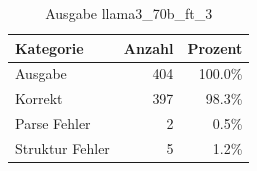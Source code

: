 
\begin{table}[!ht]
\centering
\begin{tabular}{lrr}
\toprule
\textbf{Kategorie} & \textbf{Anzahl} & \textbf{Prozent} \\
\midrule
Ausgabe & 404 & 100.0\% \\
Korrekt & 397 & 98.3\% \\
Parse Fehler & 2 & 0.5\% \\
Struktur Fehler & 5 & 1.2\% \\
\bottomrule
\end{tabular}
\caption{Ausgabe llama3_70b_ft_3}
\label{tab:file_counts}
\end{table}
    